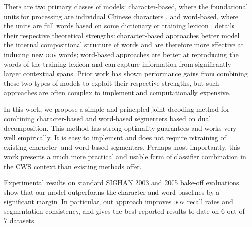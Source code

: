 There are two primary classes of models: character-based, where the foundational units for processing are individual Chinese characters \cite{Xue:2003:IJCLCLP,Tseng:2005:SIGHAN,Zhang:2006:HLT-NAACL,Wang:2010:COLING}, and word-based, where the units are full words based on some dictionary or training lexicon \cite{Andrew:2006:EMNLP,Zhang:2007:ACL}.  details their respective theoretical strengths: character-based approaches better model the internal compositional structure of words and are therefore more effective at inducing new \textsc{oov} words; word-based approaches are better at reproducing the words of the training lexicon and can capture information from significantly larger contextual spans. Prior work has shown performance gains from combining these two types of models to exploit their respective strengths, but such approaches are often complex to implement and computationally expensive.

In this work, we propose a simple and principled joint decoding method for combining character-based and word-based segmenters based on dual decomposition. This method has strong optimality guarantees and works very well empirically. It is easy to implement and does not require retraining of existing character- and word-based segmenters. Perhaps most importantly, this work presents a much more practical and usable form of classifier combination in the CWS context than existing methods offer.

Experimental results on standard SIGHAN 2003 and 2005 bake-off evaluations show that our model outperforms the character and word baselines by a significant margin.
In particular, out approach improves \textsc{oov} recall rates and segmentation consistency, %
and gives the best reported results to date on 6 out of 7 datasets.